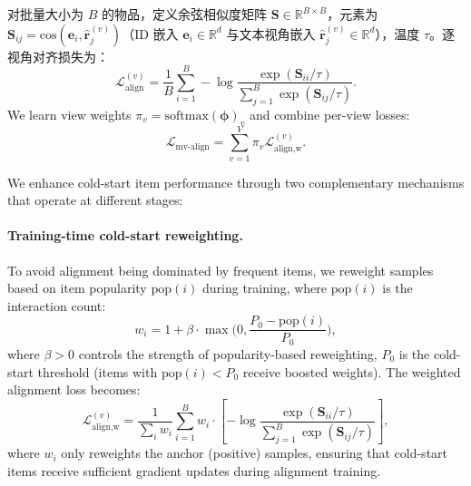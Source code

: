 \documentclass[sigconf,natbib=true,anonymous]{acmart}
\begin{document}
对批量大小为 $B$ 的物品，定义余弦相似度矩阵 $\mathbf{S} \in \mathbb{R}^{B \times B}$，元素为
$\mathbf{S}_{ij} = \mathrm{cos}(\mathbf{e}_{i},\hat{\mathbf{r}}_{j}^{(v)})$（ID 嵌入 $\mathbf{e}_i \in \mathbb{R}^d$
与文本视角嵌入 $\hat{\mathbf{r}}_j^{(v)} \in \mathbb{R}^d$），温度 $\tau$。逐视角对齐损失为：
\begin{equation}
  \mathcal{L}_{\text{align}}^{(v)} =
  \frac{1}{B}\sum_{i=1}^{B}
  -\log \frac{\exp(\mathbf{S}_{ii}/\tau)}{\sum_{j=1}^{B}\exp(\mathbf{S}_{ij}/\tau)}.
\end{equation}
We learn view weights $\pi_v=\mathrm{softmax}(\boldsymbol{\phi})_v$
and combine per-view losses:
\begin{equation}
  \mathcal{L}_{\text{mv-align}} = \sum_{v=1}^{V}\pi_v \mathcal{L}_{\text{align,w}}^{(v)}.
\end{equation}

We enhance cold-start item performance through two complementary
mechanisms that operate at different stages:

\paragraph{Training-time cold-start reweighting.}
To avoid alignment being dominated by frequent items, we
reweight samples based on item popularity $\mathrm{pop}(i)$
during training, where $\mathrm{pop}(i)$ is the interaction count:
\begin{equation}
  w_i = 1 + \beta\cdot \max\Big(0, \frac{P_0-\mathrm{pop}(i)}{P_0}\Big),
  \label{eq:cold_reweight}
\end{equation}
where $\beta>0$ controls the strength of popularity-based reweighting,
$P_0$ is the cold-start threshold (items with $\mathrm{pop}(i) < P_0$
receive boosted weights). The weighted alignment loss becomes:
\begin{equation}
  \mathcal{L}_{\text{align,w}}^{(v)} =
  \frac{1}{\sum_i w_i}\sum_{i=1}^{B} w_i \cdot
  \left[-\log \frac{\exp(\mathbf{S}_{ii}/\tau)}{\sum_{j=1}^{B}\exp(\mathbf{S}_{ij}/\tau)}\right],
\end{equation}
where $w_i$ only reweights the anchor (positive) samples, ensuring
that cold-start items receive sufficient gradient updates during
alignment training.
\end{document}
